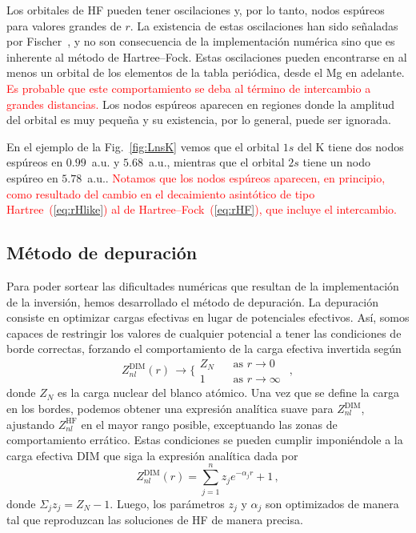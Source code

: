Los orbitales de HF pueden tener oscilaciones y, por lo tanto, nodos 
espúreos para valores grandes de $r$. La existencia de estas 
oscilaciones han sido señaladas por Fischer~\cite{FroeseFischer:97}, y 
no son consecuencia de la implementación numérica sino que es inherente 
al método de Hartree--Fock. Estas oscilaciones pueden encontrarse en al 
menos un orbital de los elementos de la tabla periódica, desde el Mg en 
adelante. \textcolor{red}{Es probable que este comportamiento se deba al 
término de intercambio a grandes distancias.} Los nodos espúreos 
aparecen en regiones donde la amplitud del orbital es muy pequeña y su 
existencia, por lo general, puede ser ignorada.

En el ejemplo de la Fig.~\ref{fig:LnsK} vemos que el orbital $1s$ del K 
tiene dos nodos espúreos en $0.99$~a.u. y $5.68$~a.u., mientras que el 
orbital $2s$ tiene un nodo espúreo en $5.78$~a.u.. 
\textcolor{red}{Notamos que los nodos espúreos aparecen, en principio, 
como resultado del cambio en el decaimiento asintótico de tipo 
Hartree~(\ref{eq:rHlike}) al de Hartree--Fock~(\ref{eq:rHF}), que 
incluye el intercambio.}

\subsection{Método de depuración}
\label{subsec:depuracion}

Para poder sortear las dificultades numéricas que resultan de la 
implementación de la inversión, hemos desarrollado el método de 
depuración. La depuración consiste en optimizar cargas efectivas en 
lugar de potenciales efectivos. Así, somos capaces de restringir los 
valores de cualquier potencial a tener las condiciones de borde 
correctas, forzando el comportamiento de la carga efectiva invertida 
según
\begin{equation}
Z_{nl}^{\mathrm{DIM}}(r) \, \rightarrow 
\bigg\{ 
\begin{array}{ll}
Z_{N}  \ \  & \ \ \text{as\ \ }r  \rightarrow 0\  \\ 
1           & \ \ \text{as\ \ }r  \rightarrow \infty \ 
\end{array}\,,
\label{eq:Zasympt}
\end{equation}
donde $Z_N$ es la carga nuclear del blanco atómico. Una vez que se 
define la carga en los bordes, podemos obtener una expresión analítica
suave para $Z_{nl}^{\mathrm{DIM}}$, ajustando $Z_{nl}^{\mathrm{HF}}$ en
el mayor rango posible, exceptuando las zonas de comportamiento errático.
Estas condiciones se pueden cumplir imponiéndole a la carga efectiva 
DIM que siga la expresión analítica dada por
\begin{equation}
Z_{nl}^{\mathrm{DIM}}(r)= \sum_{j=1}^{n} z_j e^{-\alpha_j r}+1 \,,
\label{eq:atomzDIM}
\end{equation}
donde $\Sigma_j z_j=Z_N-1$. Luego, los parámetros $z_j$ y $\alpha_j$ 
son optimizados de manera tal que reproduzcan las soluciones de HF de 
manera precisa.

